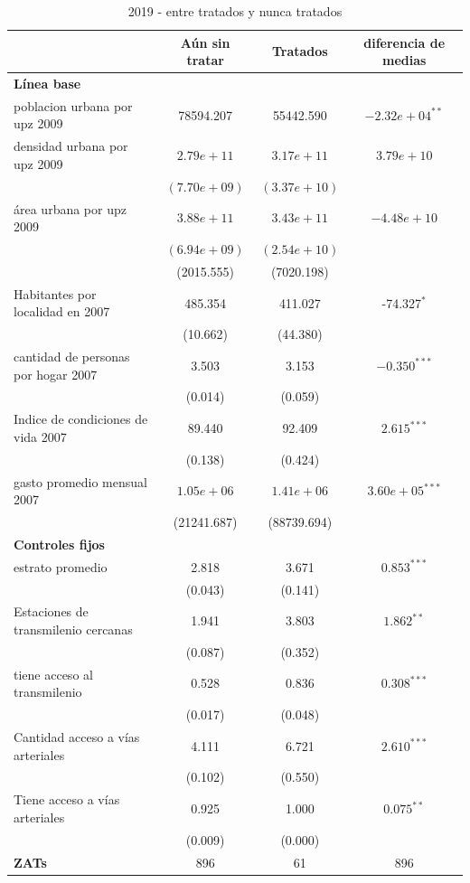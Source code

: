 \documentclass{article}
\begin{document}
\begin{table} [H]
  \centering
  \caption{2019 - entre tratados y nunca tratados}
  \label{tab:comparacion_2019}
  \begin{tabular}{l c c c}
    \toprule
    & \textbf{Aún sin tratar} & \textbf{Tratados} & \textbf{diferencia de medias} \\
    \midrule
    \multicolumn{4}{l}{\textbf{Línea base}} \\
    \midrule
    poblacion urbana por upz 2009 & 78594.207 & 55442.590 & $-2.32e+04^{**}$ \\
    densidad urbana por upz 2009 & $2.79e+11$ & $3.17e+11$ & $3.79e+10$ \\
    & $(7.70e+09)$ & $(3.37e+10)$ & \\
    área urbana por upz 2009 & $3.88e+11$ & $3.43e+11$ & $-4.48e+10$ \\
    & $(6.94e+09)$ & $(2.54e+10)$ & \\
    & (2015.555) & (7020.198) & \\
    Habitantes por localidad en 2007 & 485.354 & 411.027 & -74.327$^{*}$ \\
    & (10.662) & (44.380) & \\
    cantidad de personas por hogar 2007 & 3.503 & 3.153 & $-0.350^{***}$ \\
    & (0.014) & (0.059) & \\
    Indice de condiciones de vida 2007 & 89.440 & 92.409 & $2.615^{***}$ \\
    & (0.138) & (0.424) & \\
    gasto promedio mensual 2007 & $1.05e+06$ & $1.41e+06$ & $3.60e+05^{***}$ \\
    & (21241.687) & (88739.694) & \\
    \midrule
    \multicolumn{4}{l}{\textbf{Controles fijos}} \\
    \midrule
    estrato promedio & 2.818 & 3.671 & $0.853^{***}$ \\
    & (0.043) & (0.141) & \\
    Estaciones de transmilenio cercanas & 1.941 & 3.803 & $1.862^{**}$ \\
    & (0.087) & (0.352) & \\
    tiene acceso al transmilenio & 0.528 & 0.836 & $0.308^{***}$ \\
    & (0.017) & (0.048) & \\
    Cantidad acceso a vías arteriales & 4.111 & 6.721 & $2.610^{***}$ \\
    & (0.102) & (0.550) & \\
    Tiene acceso a vías arteriales & 0.925 & 1.000 & $0.075^{**}$ \\
    & (0.009) & (0.000) & \\
    \midrule
    \textbf{ZATs} & 896 & 61 & 896 \\
    \bottomrule
  \end{tabular}
\end{table}
\end{document}

